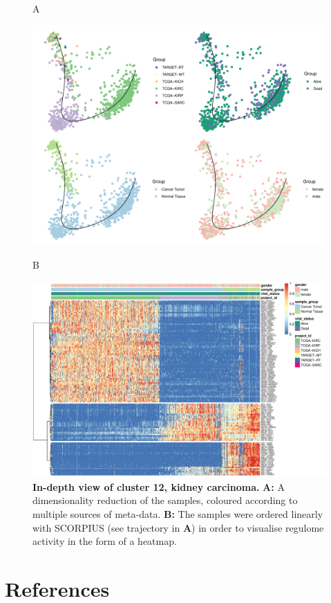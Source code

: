 \begin{figure}[H]
	A
	\begin{center}\includegraphics[width=.85\linewidth]{fig/tcga/zoom_cluster12_kidney-carcinoma_plot.pdf}\end{center}
	B
	\begin{center}\includegraphics[width=.85\linewidth]{fig/tcga/zoom_cluster12_kidney-carcinoma_heatmap.pdf}\end{center}
	\caption{
		\textbf{In-depth view of cluster 12, kidney carcinoma.} 
		\textbf{A:} A dimensionality reduction of the samples, coloured according to multiple sources of meta-data. 
		\textbf{B:} The samples were ordered linearly with SCORPIUS (see trajectory in \textbf{A}) in order to visualise regulome activity in the form of a heatmap.
	}
	\label{fig:zoom12}
\end{figure}



\clearpage
\section{References}
\printbibliography[heading=none]
